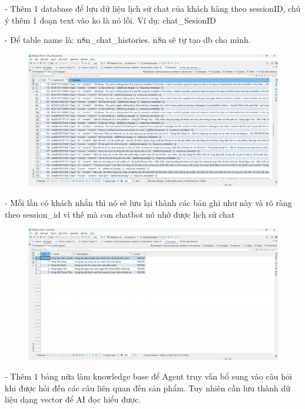 - Thêm 1 database để lưu dữ liệu lịch sử chat của khách hàng theo sessionID, chú ý thêm 1 đoạn text vào ko là nó lỗi. Ví dụ: chat\_SesionID

- Để table name là: n8n\_chat\_histories. n8n sẽ tự tạo db cho mình.


\begin{figure}[htbp]
    \centering
    \includegraphics[width=1\linewidth]{Chap1-7/db-data.pdf}
\end{figure}
- Mỗi lần có khách nhắn thì nó sẽ lưu lại thành các bản ghi như này và rõ ràng theo session\_id vì thế mà con chatbot nó nhớ được lịch sử chat

\begin{figure}[htbp]
    \centering
    \includegraphics[width=1\linewidth]{Chap1-7/db-data-vong.pdf}
\end{figure}

- Thêm 1 bảng nữa làm knowledge base để Agent truy vấn bổ sung vào câu hỏi khi được hỏi đến các câu liên quan đến sản phẩm. Tuy nhiên cần lưu thành dữ liệu dạng vector để AI đọc hiểu được.

